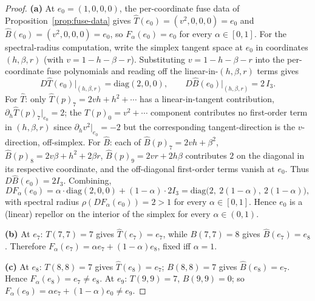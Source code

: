 \documentclass[11pt,reqno]{amsart}
\theoremstyle{plain}
\theoremstyle{definition}
\theoremstyle{remark}
\newcommand{\Tfuse}{\widehat{T}}
\newcommand{\Bfuse}{\widehat{B}}
\begin{document}
\begin{proof}
\textbf{(a)} At $e_{0} = (1, 0, 0, 0)$, the per-coordinate fuse
data of Proposition~\ref{prop:fuse-data} gives
$\Tfuse(e_{0}) = (v^{2}, 0, 0, 0) = e_{0}$ and
$\Bfuse(e_{0}) = (v^{2}, 0, 0, 0) = e_{0}$, so $F_{\alpha}(e_{0})
= e_{0}$ for every $\alpha\in[0,1]$.
For the spectral-radius computation, write the simplex tangent
space at $e_{0}$ in coordinates $(h, \beta, r)$ (with
$v = 1 - h - \beta - r$). Substituting $v = 1 - h - \beta - r$
into the per-coordinate fuse polynomials and reading off the
linear-in-$(h, \beta, r)$ terms gives
\[
  D\Tfuse(e_{0})\big|_{(h,\beta,r)} = \mathrm{diag}(2, 0, 0),
  \qquad
  D\Bfuse(e_{0})\big|_{(h,\beta,r)} = 2\,I_{3}.
\]
For $\Tfuse$: only $\Tfuse(p)_{7} = 2vh + h^{2} + \cdots$ has a
linear-in-tangent contribution, $\partial_{h}\Tfuse(p)_{7}|_{e_{0}}
= 2$; the $\Tfuse(p)_{0} = v^{2} + \cdots$ component contributes
no first-order term in $(h, \beta, r)$ since
$\partial_{h}v^{2}|_{e_{0}} = -2$ but the corresponding
tangent-direction is the $v$-direction, off-simplex. For
$\Bfuse$: each of
$\Bfuse(p)_{7} = 2vh + \beta^{2}$,
$\Bfuse(p)_{8} = 2v\beta + h^{2} + 2\beta r$,
$\Bfuse(p)_{9} = 2vr + 2 h\beta$
contributes $2$ on the diagonal in its respective coordinate, and
the off-diagonal first-order terms vanish at $e_{0}$. Thus
$D\Bfuse(e_{0}) = 2I_{3}$. Combining,
\[
  DF_{\alpha}(e_{0})
  = \alpha \cdot \mathrm{diag}(2, 0, 0) + (1-\alpha)\cdot 2 I_{3}
  = \mathrm{diag}\bigl(2,\ 2(1-\alpha),\ 2(1-\alpha)\bigr),
\]
with spectral radius $\rho(DF_{\alpha}(e_{0})) = 2 > 1$ for every
$\alpha\in[0, 1]$. Hence $e_{0}$ is a (linear) repellor on the
interior of the simplex for every $\alpha\in(0, 1)$.

\textbf{(b)} At $e_{7}$: $T(7, 7) = 7$ gives $\Tfuse(e_{7}) =
e_{7}$, while $B(7, 7) = 8$ gives $\Bfuse(e_{7}) = e_{8}$.
Therefore $F_{\alpha}(e_{7}) = \alpha e_{7} + (1-\alpha) e_{8}$,
fixed iff $\alpha = 1$.

\textbf{(c)} At $e_{8}$: $T(8, 8) = 7$ gives $\Tfuse(e_{8}) =
e_{7}$; $B(8, 8) = 7$ gives $\Bfuse(e_{8}) = e_{7}$. Hence
$F_{\alpha}(e_{8}) = e_{7}\neq e_{8}$. At $e_{9}$:
$T(9, 9) = 7$, $B(9, 9) = 0$; so $F_{\alpha}(e_{9}) =
\alpha e_{7} + (1-\alpha)e_{0}\neq e_{9}$.


\end{proof}
\end{document}
